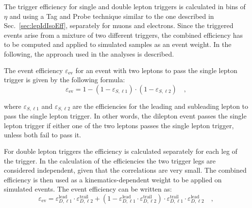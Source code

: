The trigger efficiency for single and double lepton triggers is calculated in bins of $\eta$ and \pt using a Tag and Probe technique similar to the one described in Sec.~\ref{sec:lepIdIsoEff}, separately for muons and electrons. Since the triggered events arise from a mixture of two different triggers, the combined efficiency has to be computed and applied to simulated samples as an event weight. In the following, the approach used in the \hwwllnn analyses is described.

The event efficiency $\varepsilon_\mathrm{ev}$ for an event with two leptons to pass the single lepton trigger is given by the following formula:
\begin{equation}\label{eq:single_trigg}
\varepsilon_\mathrm{ev} = 1 - (1-\varepsilon_{S,\ell1})\cdot(1-\varepsilon_{S,\ell2})\quad,
\end{equation}

\noindent where $\varepsilon_{S,\ell1}$ and $\varepsilon_{S,\ell2}$ are the efficiencies for the leading and subleading lepton to pass the single lepton trigger. In other words, the dilepton event passes the single lepton trigger if either one of the two leptons passes the single lepton trigger, unless both fail to pass it. 

For double lepton triggers the efficiency is calculated separately for each leg of the trigger. In the calculation of the efficiencies the two trigger legs are considered independent, given that the correlations are very small. The combined efficiency is then used as a kinematics-dependent weight to be applied on simulated events. The event efficiency can be written as:
\begin{equation}\label{eq:double_trigg}
\varepsilon_\mathrm{ev}  = \varepsilon_{D,\ell1}^\mathrm{lead} \cdot \varepsilon_{D,\ell2}^\mathrm{trail} + (  1 -  \varepsilon_{D,\ell1}^\mathrm{lead} \cdot \varepsilon_{D,\ell2}^\mathrm{trail})\cdot\varepsilon_{D,\ell1}^\mathrm{trail} \cdot \varepsilon_{D,\ell2}^\mathrm{lead} \quad,
\end{equation}

